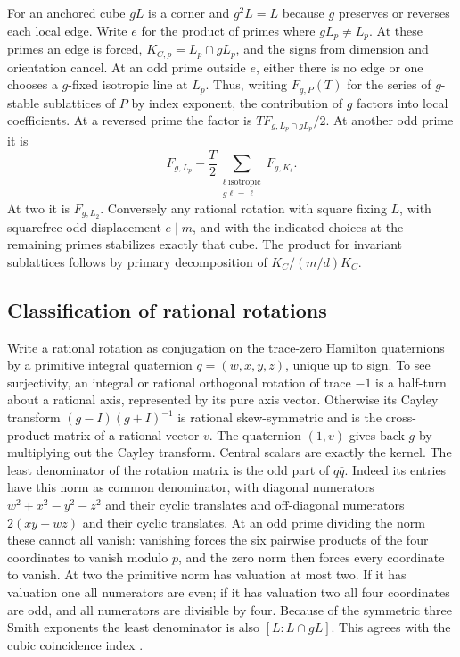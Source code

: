 For an anchored cube $gL$ is a corner and $g^2L=L$ because $g$ preserves
or reverses each local edge. Write $e$ for the product of primes where
$gL_p\ne L_p$. At these primes an edge is forced, $K_{C,p}=L_p\cap gL_p$,
and the signs from dimension and orientation cancel. At an odd prime
outside $e$, either there is no edge or one chooses a $g$-fixed isotropic
line at $L_p$. Thus, writing $F_{g,P}(T)$ for the series of $g$-stable
sublattices of $P$ by index exponent, the contribution of $g$ factors
into local coefficients. At a reversed prime the factor is
$TF_{g,L_p\cap gL_p}/2$. At another odd prime it is
\[
 F_{g,L_p}-\frac T2\sum_{\substack{\ell\ \text{isotropic}\\g\ell=\ell}} F_{g,K_\ell}.
\]
At two it is $F_{g,L_2}$. Conversely any rational rotation with square
fixing $L$, with squarefree odd displacement $e\mid m$, and with the
indicated choices at the remaining primes stabilizes exactly that cube.
The product for invariant sublattices follows by primary decomposition
of $K_C/(m/d)K_C$.

\subsection*{Classification of rational rotations}
Write a rational rotation as conjugation on the trace-zero Hamilton
quaternions by a primitive integral quaternion $q=(w,x,y,z)$, unique
up to sign. To see surjectivity, an integral or rational orthogonal
rotation of trace $-1$ is a half-turn about a rational axis, represented
by its pure axis vector. Otherwise its Cayley transform
$(g-I)(g+I)^{-1}$ is rational skew-symmetric and is the cross-product
matrix of a rational vector $v$. The quaternion $(1,v)$ gives back
$g$ by multiplying out the Cayley transform. Central scalars are exactly
the kernel. The least denominator of the rotation matrix is the odd part
of $q\bar q$. Indeed its entries have this norm as common denominator,
with diagonal numerators $w^2+x^2-y^2-z^2$ and their cyclic translates
and off-diagonal numerators $2(xy\pm wz)$ and their cyclic translates.
At an odd prime dividing the norm these cannot all vanish: vanishing
forces the six pairwise products of the four coordinates to vanish
modulo $p$, and the zero norm then forces every coordinate to vanish.
At two the primitive norm has valuation at most two. If it has valuation
one all numerators are even; if it has valuation two all four coordinates
are odd, and all numerators are divisible by four. Because of the
symmetric three Smith exponents the least denominator is also
$[L:L\cap gL]$. This agrees with the cubic coincidence index \cite{Baake}.


